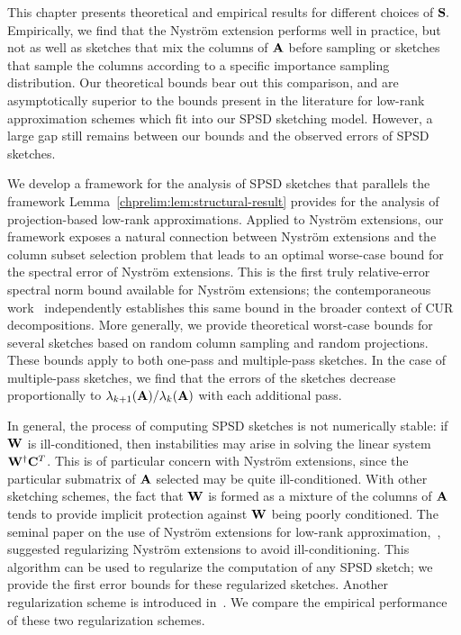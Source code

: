 This
chapter presents theoretical and empirical results for different choices of $\mathbf{S}.$
Empirically, we find that the Nystr\"om extension performs well in practice, but
not as well as sketches that mix the columns of $\mathbf{A}$ before sampling or sketches
that sample the columns according to a specific importance sampling distribution.
Our theoretical bounds bear out this comparison, and are asymptotically superior
to the bounds present in the literature for low-rank approximation schemes
which fit into our SPSD sketching model. However, a large gap still remains between
our bounds and the observed errors of SPSD sketches.

We develop a framework for the analysis of SPSD sketches that parallels the framework 
Lemma~\ref{chprelim:lem:structural-result} provides for the analysis of projection-based
low-rank approximations. Applied to Nystr\"om extensions, our framework exposes a natural connection between Nystr\"om extensions 
and the column subset selection problem that leads to an optimal worse-case bound for
the spectral error of Nystr\"om extensions. This is the first truly
relative-error spectral norm bound available for Nystr\"om extensions; 
the contemporaneous work~\cite{CD11} independently establishes this same bound in the
broader context of CUR decompositions. More generally, we provide
theoretical worst-case bounds for several sketches based on random column sampling and random projections.
These bounds apply to both
one-pass and multiple-pass sketches. In the case of multiple-pass sketches, we find that
the errors of the sketches decrease proportionally to $\lambda_{k+1}(\mathbf{A})/\lambda_k(\mathbf{A})$
with each additional pass.

In general, the process of computing SPSD sketches is not numerically stable: if $\mathbf{W}$ is 
ill-conditioned, then instabilities may arise in solving the linear system 
$\mathbf{W}^\dagger \mathbf{C}^T$. 
This is of particular concern with Nystr\"om extensions, since the particular
submatrix of $\mathbf{A}$ selected may be quite ill-conditioned. With other sketching schemes,
the fact that $\mathbf{W}$ is formed as a mixture of the columns of $\mathbf{A}$ tends to
provide implicit protection against $\mathbf{W}$ being poorly conditioned. The seminal
paper on the use of Nystr\"om extensions for low-rank approximation,~\cite{WS01},
suggested regularizing Nystr\"om extensions to avoid ill-conditioning. This
algorithm can be used to regularize the computation of any SPSD sketch; we provide
the first error bounds for these regularized sketches. Another regularization
scheme is introduced in~\cite{CD11}. We compare the empirical performance of these
two regularization schemes.

